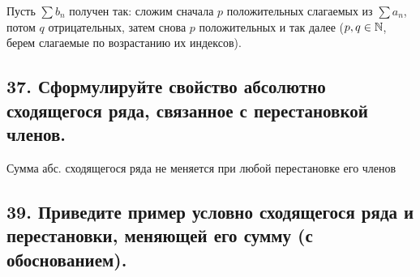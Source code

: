 \documentclass[a4paper, fleqn]{article}
\begin{document}
    Пусть $\sum b_n$ получен так: сложим сначала $p$ положительных слагаемых из $\sum a_n$, потом $q$ отрицательных, затем снова $p$ положительных и так далее ($p, q \in \mathbb{N}$, берем слагаемые по возрастанию их индексов).
    
    \subsection*{37. Сформулируйте свойство абсолютно сходящегося ряда, связанное с перестановкой членов.}
    \begin{proposition}
        Сумма абс. сходящегося ряда не меняется при любой перестановке его членов
    \end{proposition}
        
        
    \subsection*{39. Приведите пример условно сходящегося ряда и перестановки, меняющей его сумму
    (с обоснованием).}
    
\end{document}
